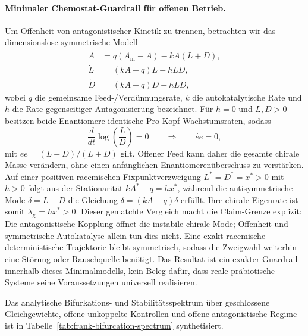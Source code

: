 \documentclass[12pt,a4paper]{article}
\theoremstyle{remark}
\begin{document}
\paragraph{Minimaler Chemostat-Guardrail für offenen Betrieb.}
Um Offenheit von antagonistischer Kinetik zu trennen, betrachten wir das dimensionslose symmetrische Modell
\begin{align}
    \dot A &= q(A_{\mathrm{in}}-A)-kA(L+D), \\
    \dot L &= (kA-q)L-hLD, \\
    \dot D &= (kA-q)D-hLD,
\end{align}
wobei $q$ die gemeinsame Feed-/Verdünnungsrate, $k$ die autokatalytische Rate und $h$ die Rate gegenseitiger Antagonisierung bezeichnet. Für $h=0$ und $L,D>0$ besitzen beide Enantiomere identische Pro-Kopf-Wachstumsraten, sodass
\begin{equation}
    \frac{d}{dt}\log\!\left(\frac{L}{D}\right)=0
    \qquad\Longrightarrow\qquad
    \dot{ee}=0,
\end{equation}
mit $ee=(L-D)/(L+D)$ gilt. Offener Feed kann daher die gesamte chirale Masse verändern, ohne einen anfänglichen Enantiomerenüberschuss zu verstärken. Auf einer positiven racemischen Fixpunktverzweigung $L^*=D^*=x^*>0$ mit $h>0$ folgt aus der Stationarität $kA^*-q=h x^*$, während die antisymmetrische Mode $\delta=L-D$ die Gleichung $\dot\delta=(kA-q)\delta$ erfüllt. Ihre chirale Eigenrate ist somit $\lambda_{\chi}=h x^*>0$. Dieser gematchte Vergleich macht die Claim-Grenze explizit: Die antagonistische Kopplung öffnet die instabile chirale Mode; Offenheit und symmetrische Autokatalyse allein tun dies nicht. Eine exakt racemische deterministische Trajektorie bleibt symmetrisch, sodass die Zweigwahl weiterhin eine Störung oder Rauschquelle benötigt. Das Resultat ist ein exakter Guardrail innerhalb dieses Minimalmodells, kein Beleg dafür, dass reale präbiotische Systeme seine Voraussetzungen universell realisieren.

Das analytische Bifurkations- und Stabilitätsspektrum über geschlossene Gleichgewichte, offene unkoppelte Kontrollen und offene antagonistische Regime ist in Tabelle~\ref{tab:frank-bifurcation-spectrum} synthetisiert.
\end{document}
